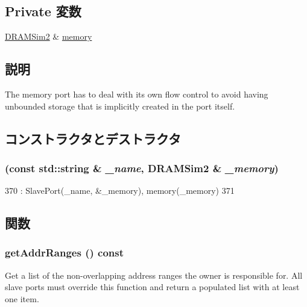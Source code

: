 \subsection*{Private 変数}
\begin{DoxyCompactItemize}
\item 
\hyperlink{classDRAMSim2_1_1DRAMSim2}{DRAMSim2} \& \hyperlink{classDRAMSim2_1_1MemoryPort_a9ad6c7bb088fd34b551f1b2653632a6c}{memory}
\end{DoxyCompactItemize}


\subsection{説明}
The memory port has to deal with its own flow control to avoid having unbounded storage that is implicitly created in the port itself. 

\subsection{コンストラクタとデストラクタ}
\hypertarget{classDRAMSim2_1_1MemoryPort_aad388e23839cbb0ef7806448934f31c0}{
\subsubsection[{MemoryPort}]{ (const std::string \& {\em \_\-name}, \/  {\bf DRAMSim2} \& {\em \_\-memory})}}
\label{classDRAMSim2_1_1MemoryPort_aad388e23839cbb0ef7806448934f31c0}



\begin{DoxyCode}
370     : SlavePort(_name, &_memory), memory(_memory)
371 { }
\end{DoxyCode}


\subsection{関数}
\hypertarget{classDRAMSim2_1_1MemoryPort_a36cf113d5e5e091ebddb32306c098fae}{
\subsubsection[{getAddrRanges}]{ getAddrRanges () const}}
\label{classDRAMSim2_1_1MemoryPort_a36cf113d5e5e091ebddb32306c098fae}
Get a list of the non-\/overlapping address ranges the owner is responsible for. All slave ports must override this function and return a populated list with at least one item.

